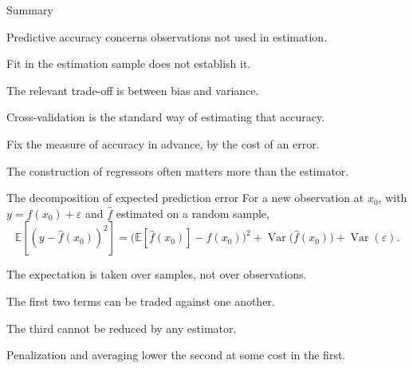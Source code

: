 \documentclass[aspectratio=169,11pt]{beamer}
\newenvironment{wideitemize}{\itemize\addtolength{\itemsep}{9pt}}{\enditemize}
\begin{document}
\begin{frame}{Summary}
\begin{wideitemize}
  \item Predictive accuracy concerns observations not used in estimation.
  \item Fit in the estimation sample does not establish it.
  \item The relevant trade-off is between bias and variance.
  \item Cross-validation is the standard way of estimating that accuracy.
  \item Fix the measure of accuracy in advance, by the cost of an error.
  \item The construction of regressors often matters more than the estimator.
\end{wideitemize}
\end{frame}

\appendix

\begin{frame}[plain]
\end{frame}

\begin{frame}{The decomposition of expected prediction error}
For a new observation at $x_0$, with $y = f(x_0) + \varepsilon$ and $\hat f$ estimated on a
random sample,
\[
  \mathbb{E}\!\left[(y - \hat f(x_0))^2\right]
  = \big(\mathbb{E}[\hat f(x_0)] - f(x_0)\big)^2
  + \operatorname{Var}\!\big(\hat f(x_0)\big)
  + \operatorname{Var}(\varepsilon).
\]
\begin{wideitemize}
  \item The expectation is taken over samples, not over observations.
  \item The first two terms can be traded against one another.
  \item The third cannot be reduced by any estimator.
  \item Penalization and averaging lower the second at some cost in the first.
\end{wideitemize}
\end{frame}
\end{document}
